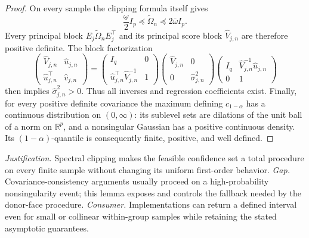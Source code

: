 \documentclass{article}
\begin{document}
\begin{proof}
On every sample the clipping formula itself gives
\[
 \frac{\underline\omega}{2}I_p
 \preceq\widetilde\Omega_n
 \preceq2\overline\omega I_p.
\]
Every principal block \(E_j\widetilde\Omega_nE_j^{\top}\) and its principal score block \(\widehat V_{j,n}\) are therefore positive definite.  The block factorization
\[
 \begin{pmatrix}\widehat V_{j,n}&\widehat u_{j,n}\\
 \widehat u_{j,n}^{\top}&\widehat v_{j,n}\end{pmatrix}
 =
 \begin{pmatrix}I_q&0\\
 \widehat u_{j,n}^{\top}\widehat V_{j,n}^{-1}&1\end{pmatrix}
 \begin{pmatrix}\widehat V_{j,n}&0\\0&\widehat\sigma_{j,n}^2\end{pmatrix}
 \begin{pmatrix}I_q&\widehat V_{j,n}^{-1}\widehat u_{j,n}\\0&1\end{pmatrix}
\]
then implies \(\widehat\sigma_{j,n}^2>0\).  Thus all inverses and regression coefficients exist.  Finally, for every positive definite covariance the maximum defining \(c_{1-\alpha}\) has a continuous distribution on \((0,\infty)\): its sublevel sets are dilations of the unit ball of a norm on \(\mathbb R^p\), and a nonsingular Gaussian has a positive continuous density.  Its \((1-\alpha)\)-quantile is consequently finite, positive, and well defined.
\end{proof}
\par\smallskip\noindent \textit{Justification.} Spectral clipping makes the feasible confidence set a total procedure on every finite sample without changing its uniform first-order behavior. \textit{Gap.} Covariance-consistency arguments usually proceed on a high-probability nonsingularity event; this lemma exposes and controls the fallback needed by the donor-face procedure. \textit{Consumer.} Implementations can return a defined interval even for small or collinear within-group samples while retaining the stated asymptotic guarantees.
\end{document}

